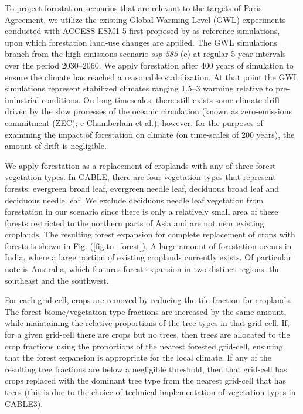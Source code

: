 \documentclass[]{article}
\begin{document}
To project forestation scenarios that are relevant to the targets of Paris Agreement, we utilize the existing Global Warming Level (GWL) experiments conducted with ACCESS-ESM1-5 first proposed by \cite{king_studying_2021} as reference simulations, upon which forestation land-use changes are applied. The GWL simulations branch from the high emissions scenario \textit{ssp-585} (c) at regular 5-year intervals over the period 2030–2060. We apply forestation after 400 years of simulation to ensure the climate has reached a reasonable stabilization. At that point the GWL simulations represent stabilized climates ranging 1.5–3 \textcelsius warming relative to pre-industrial conditions. On long timescales, there still exists some climate drift driven by the slow processes of the oceanic circulation (known as zero-emissions commitment (ZEC); c Chamberlain et al.), however, for the purposes of examining the impact of forestation on climate (on time-scales of 200 years), the amount of drift is negligible.

We apply forestation as a replacement of croplands with any of three forest vegetation types.
In CABLE, there are four vegetation types that represent forests: evergreen broad leaf, evergreen needle leaf, deciduous broad leaf and deciduous needle leaf.
We exclude deciduous needle leaf vegetation from forestation in our scenario since there is only a relatively small area of these forests restricted to the northern parts of Asia and are not near existing croplands.
The resulting forest expansion for complete replacement of crops with forests is shown in Fig. (\ref{fig:to_forest}).
A large amount of forestation occurs in India, where a large portion of existing croplands currently exists.
Of particular note is Australia, which features forest expansion in two distinct regions: the southeast and the southwest.

For each grid-cell, crops are removed by reducing the tile fraction for croplands.
The forest biome/vegetation type fractions are increased by the same amount, while maintaining the relative proportions of the tree types in that grid cell.
If, for a given grid-cell there are crops but no trees, then trees are allocated to the crop fractions using the proportions of the nearest forested grid-cell, ensuring that the forest expansion is appropriate for the local climate.
If any of the resulting tree fractions are below a negligible threshold, then that grid-cell has crops replaced with the dominant tree type from the nearest grid-cell that has trees (this is due to the choice of technical implementation of vegetation types in CABLE3).
\end{document}
